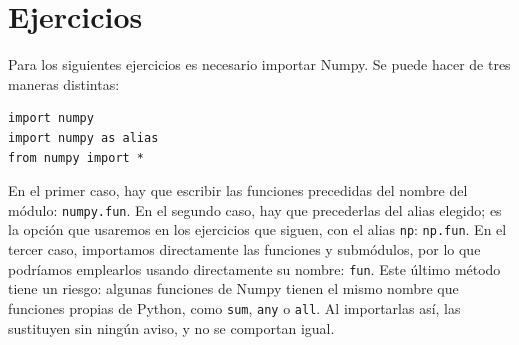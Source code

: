\section{Ejercicios}

Para los siguientes ejercicios es necesario importar Numpy. Se puede hacer de tres maneras distintas:
\begin{verbatim}
import numpy
import numpy as alias
from numpy import *
\end{verbatim}
En el primer caso, hay que escribir las funciones precedidas del nombre del módulo: \texttt{numpy.fun}. En el segundo caso, hay que precederlas del alias elegido; es la opción que usaremos en los ejercicios que siguen, con el alias \texttt{np}: \texttt{np.fun}. En el tercer caso, importamos directamente las funciones y submódulos, por lo que podríamos emplearlos usando directamente su nombre: \texttt{fun}. Este último método tiene un riesgo: algunas funciones de Numpy tienen el mismo nombre que funciones propias de Python, como \texttt{sum}, \texttt{any} o \texttt{all}. Al importarlas así, las sustituyen sin ningún aviso, y no se comportan igual.
